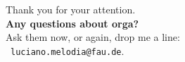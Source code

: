 \documentclass[aspectratio=169,t]{beamer}
\begin{document}
  { %
    \begin{frame}[c]
      \begin{center}
        Thank you for your attention.\\
        {\bf Any questions about orga?}\\[0.5cm]
        Ask them now, or again, drop me a line: \\
        \faSendO \ \texttt{luciano.melodia@fau.de}.
      \end{center}
    \end{frame}
  }
\end{document}
